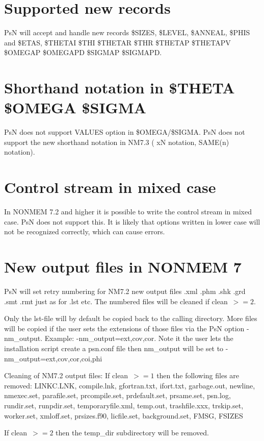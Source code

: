 \section{Supported new records}
PsN will accept and handle new records \$SIZES, \$LEVEL, \$ANNEAL, \$PHIS and \$ETAS,
\$THETAI \$THI \$THETAR \$THR \$THETAP \$THETAPV \$OMEGAP \$OMEGAPD
\$SIGMAP \$SIGMAPD.

\section{Shorthand notation in \$THETA \$OMEGA \$SIGMA}
PsN does not support VALUES option in \$OMEGA/\$SIGMA. 
PsN does not support the new shorthand notation in NM7.3 ( xN notation, SAME(n) notation).

\section{Control stream in mixed case}
In NONMEM 7.2 and higher it is possible to write the control stream in mixed case. PsN does not support this. It is likely that options written in lower case will not be recognized correctly, which can cause errors.

\section{New output files in NONMEM 7}
PsN will set retry numbering for NM7.2 new output files .xml .phm .shk .grd .smt .rmt just as for .lst etc. The numbered files will be cleaned if \mbox{clean $>=2$}.

Only the lst-file will by default be copied back to the calling directory. 
More files will be copied if the user sets the extensions of those files via the PsN option -nm\_output. Example: -nm\_output=ext,cov,cor. Note it the user lets the installation script create a psn.conf file then nm\_output will be set to -nm\_output=ext,cov,cor,coi,phi 

Cleaning of NM7.2 output files: If \mbox{clean $>=1$} then the following files are removed: LINKC.LNK, compile.lnk, gfortran.txt, ifort.txt, garbage.out, newline, nmexec.set, parafile.set, prcompile.set, prdefault.set, prsame.set, psn.log, rundir.set, runpdir.set, temporaryfile.xml, temp.out, trashfile.xxx, trskip.set, worker.set, xmloff.set, prsizes.f90, licfile.set, background.set, FMSG, FSIZES

If \mbox{clean $>=2$} then the temp\_dir subdirectory will be removed.

